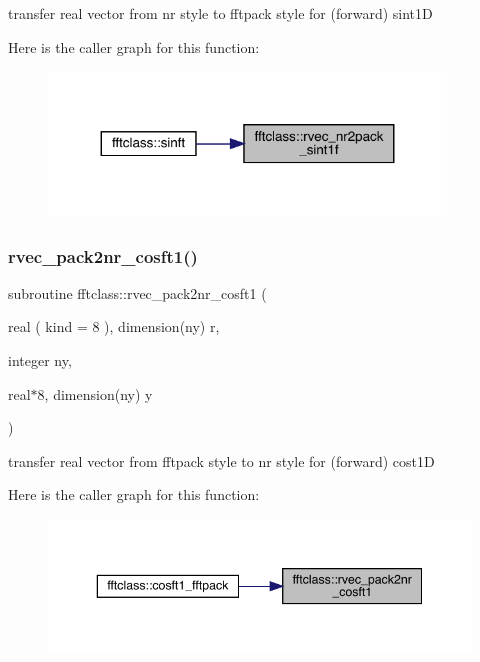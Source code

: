 transfer real vector from nr style to fftpack style for (forward) sint1D 

Here is the caller graph for this function\+:\nopagebreak
\begin{figure}[H]
\begin{center}
\leavevmode
\includegraphics[width=299pt]{namespacefftclass_ae1f9bdd4e66db530852187dff115ae36_icgraph}
\end{center}
\end{figure}
\mbox{\label{namespacefftclass_a8f3b38a9f0433b6b847b670b98acab99}} 
\subsubsection{\texorpdfstring{rvec\_pack2nr\_cosft1()}{rvec\_pack2nr\_cosft1()}}
{\footnotesize\ttfamily subroutine fftclass\+::rvec\+\_\+pack2nr\+\_\+cosft1 (\begin{DoxyParamCaption}\item[{real ( kind = 8 ), dimension(ny)}]{r,  }\item[{integer}]{ny,  }\item[{real$\ast$8, dimension(ny)}]{y }\end{DoxyParamCaption})}



transfer real vector from fftpack style to nr style for (forward) cost1D 

Here is the caller graph for this function\+:\nopagebreak
\begin{figure}[H]
\begin{center}
\leavevmode
\includegraphics[width=343pt]{namespacefftclass_a8f3b38a9f0433b6b847b670b98acab99_icgraph}
\end{center}
\end{figure}
\mbox{\label{namespacefftclass_a5b968c02330134b7f60b0b19e3192e77}} 
